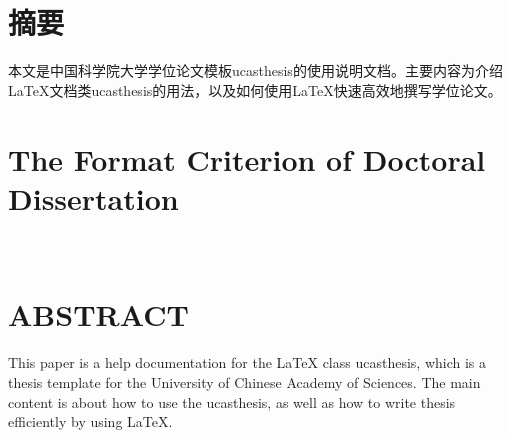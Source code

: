 \maketitle%
\chapter{摘\quad 要}%
\setcounter{page}{1}%

本文是中国科学院大学学位论文模板ucasthesis的使用说明文档。主要内容为介绍\LaTeX{}文档类ucasthesis的用法，以及如何使用\LaTeX{}快速高效地撰写学位论文。

{
    \chapter*{The Format Criterion of Doctoral Dissertation}%
    {
        \linespread{1.25}
        {\ }\par
    }
    \chapter{ABSTRACT}
}%
This paper is a help documentation for the \LaTeX{} class ucasthesis, which is  a thesis template for the University of Chinese Academy of Sciences. The main content is about how to use the ucasthesis, as well as how to write thesis efficiently by using \LaTeX{}.

